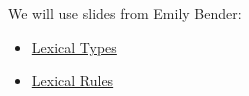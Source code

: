 \documentclass[a4paper,landscape,headrule,footrule]{foils}
\begin{document}
\maketitle



We will use slides from Emily Bender:


\begin{itemize}
\item \href{ch08a-uw.pdf}{Lexical Types}
\item \href{ch08a-uw.pdf}{Lexical Rules}
\end{itemize}






\end{document}
